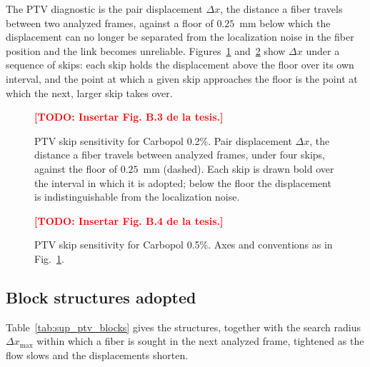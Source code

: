 \documentclass[%
  aip,
  pof,
  reprint,
  floatfix
]{revtex4-2}
\newcommand{\todo}[1]{\textcolor{red}{\textbf{[TODO: #1]}}}
\begin{document}
The PTV diagnostic is the pair displacement $\Delta x$, the distance a fiber travels between two analyzed frames, against a floor of $0.25$~mm below which the displacement can no longer be separated from the localization noise in the fiber position and the link becomes unreliable. Figures~\ref{fig:sup_ptv_disp_02} and~\ref{fig:sup_ptv_disp_05} show $\Delta x$ under a sequence of skips: each skip holds the displacement above the floor over its own interval, and the point at which a given skip approaches the floor is the point at which the next, larger skip takes over.

\begin{figure}[htb]
    \centering
    \todo{Insertar Fig. B.3 de la tesis.}
    \caption{PTV skip sensitivity for Carbopol 0.2\%. Pair displacement $\Delta x$, the distance a fiber travels between analyzed frames, under four skips, against the floor of $0.25$~mm (dashed). Each skip is drawn bold over the interval in which it is adopted; below the floor the displacement is indistinguishable from the localization noise.}
    \label{fig:sup_ptv_disp_02}
\end{figure}

\begin{figure}[htb]
    \centering
    \todo{Insertar Fig. B.4 de la tesis.}
    \caption{PTV skip sensitivity for Carbopol 0.5\%. Axes and conventions as in Fig.~\ref{fig:sup_ptv_disp_02}.}
    \label{fig:sup_ptv_disp_05}
\end{figure}

\subsection{Block structures adopted}

Table~\ref{tab:sup_ptv_blocks} gives the structures, together with the search radius $\Delta x_{\max}$ within which a fiber is sought in the next analyzed frame, tightened as the flow slows and the displacements shorten.
\end{document}
